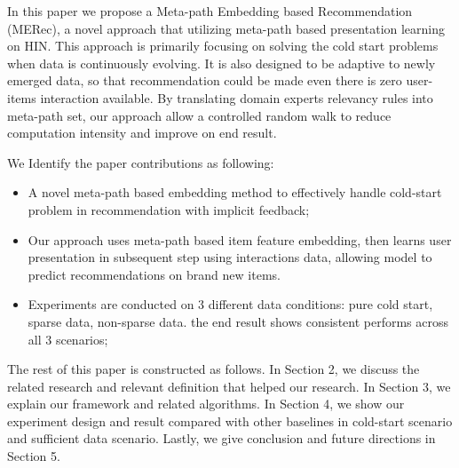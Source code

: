 In this paper we propose a Meta-path Embedding based Recommendation (MERec), a novel approach that utilizing meta-path based presentation learning on HIN. This approach is primarily focusing on solving the cold start problems when data is continuously evolving. It is also designed to be adaptive to newly emerged data, so that recommendation could be made even there is zero user-items interaction available. By translating domain experts relevancy rules into meta-path set, our approach allow a controlled random walk to reduce computation intensity and improve on end result. 

We Identify the paper contributions as following:
\begin{itemize}
    \item A novel meta-path based embedding method to effectively handle cold-start problem in  recommendation with implicit feedback;
    \item Our approach uses meta-path based item feature embedding, then learns user presentation in subsequent step using interactions data, allowing model to predict recommendations on brand new items. 
    \item Experiments are conducted on 3 different data conditions: pure cold start, sparse data, non-sparse data. the end result shows consistent performs across all 3 scenarios;
\end{itemize}

The rest of this paper is constructed as follows. In Section 2, we discuss the related research and relevant definition that helped our research. In Section 3, we explain our framework and related algorithms. In Section 4, we show our experiment design and result compared with other baselines in cold-start scenario and sufficient data scenario. Lastly, we give conclusion and future directions in Section 5.